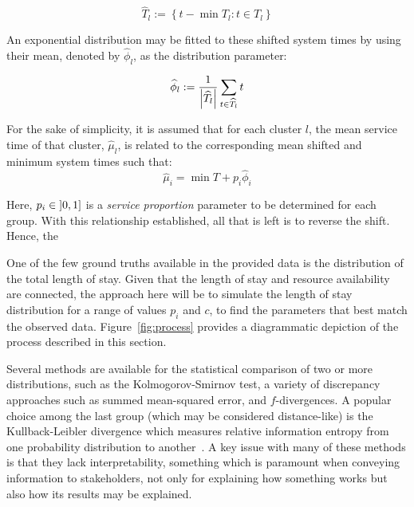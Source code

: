 \begin{equation}\label{eq:shifted}
    \widehat T_l := \left\{t - \min T_l : t \in T_l\right\}
\end{equation}

An exponential distribution may be fitted to these shifted system times by
using their mean, denoted by \(\widehat \phi_l\), as the distribution
parameter:

\begin{equation}\label{eq:shifted_mean}
    \widehat \phi_l :=
    \frac{1}{\abs*{\widehat T_l}} \sum_{t \in \widehat T_l} t
\end{equation}

For the sake of simplicity, it is assumed that for each cluster \(l\), the mean
service time of that cluster, \(\widehat \mu_l\), is related to the
corresponding mean shifted and minimum system times such that:
\begin{equation}\label{eq:services}
    \widehat \mu_i = \min T + p_i \widehat \phi_i
\end{equation}

Here, \(p_i \in \interval[open left]{0}{1}\) is a \emph{service proportion}
parameter to be determined for each group. With this relationship established,
all that is left is to reverse the shift. Hence, the 

One of the few ground truths available in the provided data is the distribution
of the total length of stay. Given that the length of stay and resource
availability are connected, the approach here will be to simulate the length of
stay distribution for a range of values \(p_i\) and \(c\), to find the
parameters that best match the observed data. Figure~\ref{fig:process} provides
a diagrammatic depiction of the process described in this section.

Several methods are available for the statistical comparison of two or more
distributions, such as the Kolmogorov-Smirnov test, a variety of discrepancy
approaches such as summed mean-squared error, and \(f\)-divergences. A popular
choice among the last group (which may be considered distance-like) is the
Kullback-Leibler divergence which measures relative information entropy from one
probability distribution to another~\cite{Kullback1951}. A key issue with many
of these methods is that they lack interpretability, something which is
paramount when conveying information to stakeholders, not only for explaining
how something works but also how its results may be explained.

